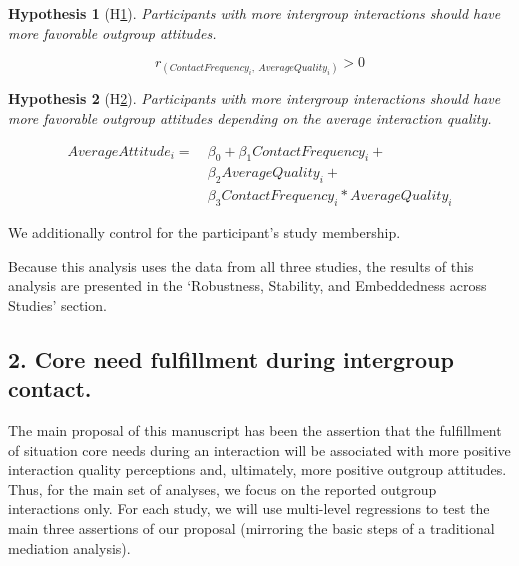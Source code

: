\documentclass[man, 12pt, a4paper, mask]{apa7}
\theoremstyle{break}
\theoremstyle{plain}
\newtheorem{subhyp}{Hypothesis}
\begin{document}
\begin{mdframed}[style=mdfhypothesis]
    \begin{subhyp}[H\ref{hyp:contactCor}] \label{hyp:contactCor}
    \addtolength{\leftskip}{\subhypskip}
    Participants with more intergroup interactions should have more favorable outgroup attitudes.
    \end{subhyp}

      \begin{fleqn}[\eqskip] 
        \begin{equation} \label{eq:ContactCor}
            r_{\left(ContactFrequency_{i},\ AverageQuality_{i}\right)} > 0
        \end{equation}
      \end{fleqn}

    \begin{subhyp}[H\ref{hyp:contactQualLM}] \label{hyp:contactQualLM}
    \addtolength{\leftskip}{\subhypskip}
    Participants with more intergroup interactions should have more favorable outgroup attitudes depending on the average interaction quality.
    \end{subhyp}

      \begin{fleqn}[\eqskip] 
        \begin{equation} \label{eq:contactQualLM}
            \begin{split}
              AverageAttitude_{i} = &\ \beta_{0} + \beta_{1}ContactFrequency_{i} + \\
                                    &\ \beta_{2}AverageQuality_{i} +\\
                                    &\ \beta_{3}ContactFrequency_{i} * AverageQuality_{i}
            \end{split}
        \end{equation}
      \end{fleqn}  
      
      We additionally control for the participant's study membership.
\end{mdframed}
Because this analysis uses the data from all three studies, the results of this analysis are presented in the `Robustness, Stability, and Embeddedness across Studies' section.

\subsection{2. Core need fulfillment during intergroup contact.}
The main proposal of this manuscript has been the assertion that the fulfillment of situation core needs during an interaction will be associated with more positive interaction quality perceptions and, ultimately, more positive outgroup attitudes. Thus, for the main set of analyses, we focus on the reported outgroup interactions only. For each study, we will use multi-level regressions to test the main three assertions of our proposal (mirroring the basic steps of a traditional mediation analysis).
\end{document}
